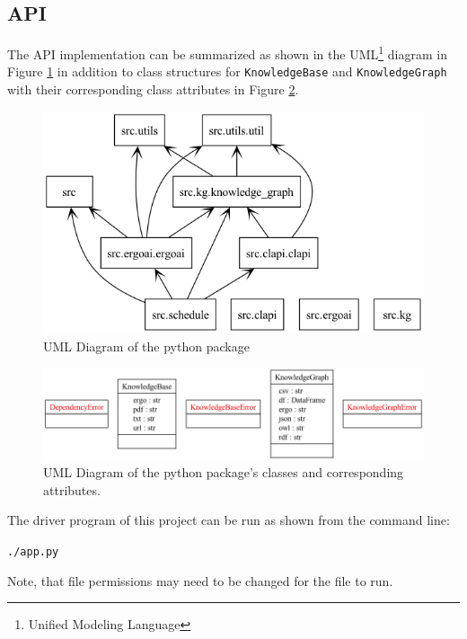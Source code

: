 \documentclass[12pt]{article}
\begin{document}
    \subsection{API}
    \label{subsec:api}

    The API implementation can be summarized as shown in the UML\footnote{Unified Modeling Language} diagram in Figure \ref{fig:uml-package} in addition to class structures for {\tt{KnowledgeBase}} and {\tt{KnowledgeGraph}} with their corresponding class attributes in Figure \ref{fig:uml-classes}.

    \begin{figure}[h!]
        \centering
        \includegraphics[scale=0.75]{figures/uml/packages_src.png}
        \caption{UML Diagram of the python package}
        \label{fig:uml-package}
    \end{figure}

    \begin{figure}[h!]
        \centering
        \includegraphics[scale=0.55]{figures/uml/classes_src.png}
        \caption{UML Diagram of the python package's classes and corresponding attributes.}
        \label{fig:uml-classes}
    \end{figure}

    The driver program of this project can be run as shown from the command line:

    {\tt{./app.py}}

    Note, that file permissions may need to be changed for the file to run.
\end{document}
